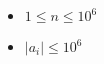 \begin{itemize}
\tightlist
\item $1\leq n \leq 10^6$
\item $|a_i| \leq 10^6$
\end{itemize}
\newpage
